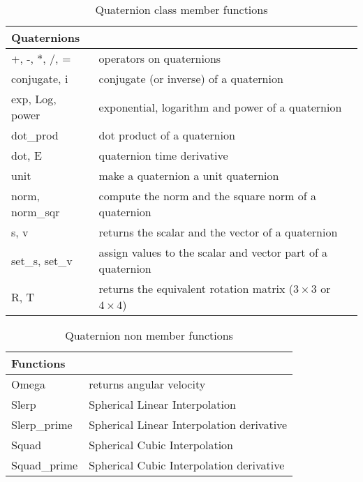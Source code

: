 \documentclass[dvips,11pt,fleqn]{report}
\begin{document}
\begin{table}[htbp]
\caption{Quaternion class member functions}
\label{tab:commandsumQuat}
\begin{center}
\begin{tabular}{||l|l||}
\hline
\hline
\multicolumn{2}{||l||}{{\bf Quaternions}} \\
\hline
\hline
+, -, *, /, = & operators on quaternions \\
\hline
conjugate, i  & conjugate (or inverse) of a quaternion \\
\hline
exp, Log, power & exponential, logarithm and power of a quaternion \\
\hline
dot\_prod & dot product of a quaternion \\
\hline
dot, E & quaternion time derivative\\
\hline
unit & make a quaternion a unit quaternion \\
\hline
norm, norm\_sqr & compute the norm and the square norm of a quaternion \\
\hline 
s, v & returns the scalar and the vector of a quaternion \\
\hline
set\_s, set\_v & assign values to the scalar and vector part of a quaternion \\
\hline
R, T  & returns the equivalent rotation matrix ($3 \times 3$ or $4 \times 4$) \\
\hline
\hline
\end{tabular}
\end{center}
\end{table}

\begin{table}[htbp]
\caption{Quaternion non member functions}
\label{tab:commandsumQuatnm}
\begin{center}
\begin{tabular}{||l|l||}
\hline
\hline
\multicolumn{2}{||l||}{{\bf Functions}} \\
\hline
\hline
Omega & returns angular velocity \\
\hline
Slerp  & Spherical Linear Interpolation \\
\hline
Slerp\_prime & Spherical Linear Interpolation derivative \\ 
\hline
Squad & Spherical Cubic Interpolation \\
\hline
Squad\_prime & Spherical Cubic Interpolation derivative \\
\hline
\hline 
\end{tabular}
\end{center}
\end{table}
\end{document}
